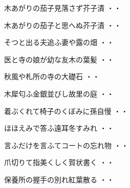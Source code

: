 \begin{shiika}木あがりの茄子見落さず芥子漬
\hfill{・・}\end{shiika}
\vspace{0.6cm}
\begin{shiika}木あがりの茄子と思へぬ芥子漬
\hfill{・・}\end{shiika}
\vspace{0.6cm}
\begin{shiika}そつと出る夫追ふ妻や露の畑
\hfill{・・}\end{shiika}
\vspace{0.6cm}
\begin{shiika}医と寺の娘が幼な友木の葉髪
\hfill{・・}\end{shiika}
\vspace{0.6cm}
\begin{shiika}秋風や札所の寺の大礎石
\hfill{・・}\end{shiika}
\vspace{0.6cm}
\begin{shiika}木犀匂ふ金銀並びし故里の庭
\hfill{・・}\end{shiika}
\vspace{0.6cm}
\begin{shiika}着ぶくれて椅子のくぼみに孫自慢
\hfill{・・}\end{shiika}
\vspace{0.6cm}
\begin{shiika}ほほえみで答ふ遠耳冬すみれ
\hfill{・・}\end{shiika}
\vspace{0.6cm}
\begin{shiika}言ふだけを言ふてコートの忘れ物
\hfill{・・}\end{shiika}
\vspace{0.6cm}
\begin{shiika}爪切りて指美くしく賀状書く
\hfill{・・}\end{shiika}
\vspace{0.6cm}
\begin{shiika}保養所の握手の別れ紅葉散る
\hfill{・・}\end{shiika}
\vspace{0.6cm}
